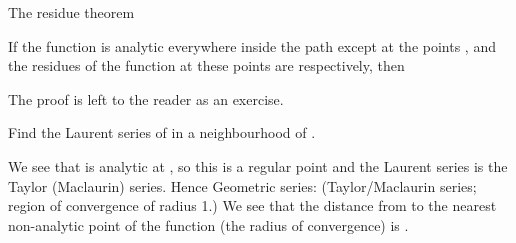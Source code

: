\EMhold


\begin{EMtheorem}{The residue theorem}

If the function  is analytic everywhere inside the path  except at the points , and the residues of the function at these points are  respectively, then

\end{EMtheorem}


The proof is left to the reader as an exercise.

\EMhold


\begin{EMexample}{}

Find the Laurent series of  in a neighbourhood of .

We see that  is analytic at , so this is a regular point and the Laurent series is the Taylor (Maclaurin) series. Hence
Geometric series:
(Taylor/Maclaurin series; region of convergence of radius 1.)
We see that the distance from  to the nearest non-analytic point of the function (the radius of convergence) is .

\end{EMexample}



